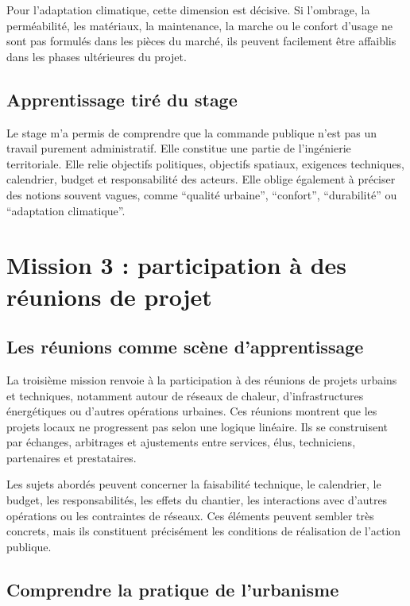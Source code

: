 \documentclass[11pt,a4paper]{report}
\begin{document}
Pour l'adaptation climatique, cette dimension est décisive. Si l'ombrage, la perméabilité, les matériaux, la maintenance, la marche ou le confort d'usage ne sont pas formulés dans les pièces du marché, ils peuvent facilement être affaiblis dans les phases ultérieures du projet.

\subsection{Apprentissage tiré du stage}

Le stage m'a permis de comprendre que la commande publique n'est pas un travail purement administratif. Elle constitue une partie de l'ingénierie territoriale. Elle relie objectifs politiques, objectifs spatiaux, exigences techniques, calendrier, budget et responsabilité des acteurs. Elle oblige également à préciser des notions souvent vagues, comme \enquote{qualité urbaine}, \enquote{confort}, \enquote{durabilité} ou \enquote{adaptation climatique}.

\section{Mission 3 : participation à des réunions de projet}

\subsection{Les réunions comme scène d'apprentissage}

La troisième mission renvoie à la participation à des réunions de projets urbains et techniques, notamment autour de réseaux de chaleur, d'infrastructures énergétiques ou d'autres opérations urbaines. Ces réunions montrent que les projets locaux ne progressent pas selon une logique linéaire. Ils se construisent par échanges, arbitrages et ajustements entre services, élus, techniciens, partenaires et prestataires.

Les sujets abordés peuvent concerner la faisabilité technique, le calendrier, le budget, les responsabilités, les effets du chantier, les interactions avec d'autres opérations ou les contraintes de réseaux. Ces éléments peuvent sembler très concrets, mais ils constituent précisément les conditions de réalisation de l'action publique.

\subsection{Comprendre la pratique de l'urbanisme}
\end{document}

